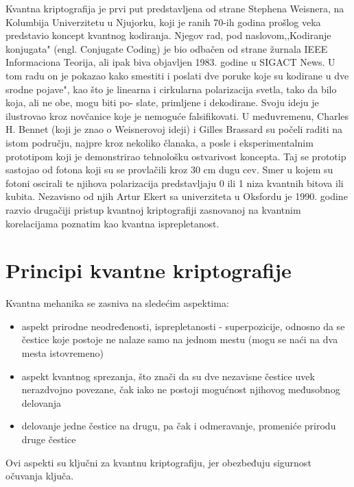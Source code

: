 \documentclass[a4paper]{article}
\begin{document}
{Kvantna kriptografija je prvi put predstavljena\cite{draganakvantna} od strane Stephena Weisnera, na Kolumbija Univerzitetu u Njujorku, koji je ranih 70-ih godina prošlog veka predstavio koncept kvantnog kodiranja. Njegov rad, pod naslovom,,Kodiranje konjugata" (engl. Conjugate Coding) je bio odbačen od strane žurnala IEEE Informaciona Teorija, ali ipak biva objavljen 1983. godine u SIGACT News. U tom radu on je pokazao kako smestiti i poslati dve poruke koje su kodirane u dve srodne pojave", kao što je linearna i cirkularna polarizacija svetla, tako da bilo koja, ali ne obe, mogu biti po- slate, primljene i dekodirane. Svoju ideju je ilustrovao kroz novčanice koje je nemoguće falsifikovati. U međuvremenu, Charles H. Bennet\cite{sandrakvantna} (koji je znao o Weisnerovoj ideji) i Gilles Brassard su počeli raditi na istom području, najpre kroz nekoliko članaka, a posle i eksperimentalnim prototipom koji je demonstrirao tehnološku ostvarivost koncepta. Taj se prototip sastojao od fotona koji su se provlačili kroz 30 cm dugu cev. Smer u kojem su fotoni oscirali te njihova polarizacija predstavljaju 0 ili 1 niza kvantnih bitova ili kubita. Nezavisno od njih Artur Ekert sa univerziteta u Oksfordu je 1990. godine razvio drugačiji pristup kvantnoj kriptografiji zasnovanoj na kvantnim korelacijama poznatim kao kvantna isprepletanost.
\section{Principi kvantne kriptografije}
Kvantna mehanika\cite{stevankvantna} se zasniva na sledećim aspektima:
\begin{itemize}
\item aspekt prirodne neodređenosti, isprepletanosti - superpozicije, odnosno da se čestice koje postoje ne nalaze samo na jednom mestu (mogu se naći na dva mesta istovremeno)
\item aspekt kvantnog sprezanja, što znači da su dve nezavisne čestice uvek nerazdvojno povezane, čak iako ne postoji mogućnost njihovog međusobnog delovanja
\item delovanje jedne čestice na drugu, pa čak i odmeravanje, promeniće prirodu druge čestice
\end{itemize}
Ovi aspekti su ključni za kvantnu kriptografiju, jer obezbeđuju sigurnost očuvanja ključa.
}
\end{document}
